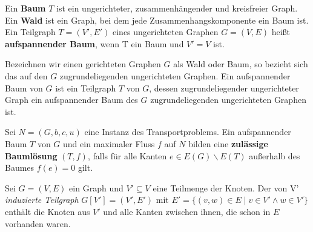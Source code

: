 \begin{defn}Ein \textbf{Baum} $T$ ist ein ungerichteter, zusammenhängender und kreisfreier Graph. Ein \textbf{Wald} ist ein Graph, bei dem jede Zusammenhangskomponente ein Baum ist. Ein Teilgraph $T=(V',E')$ eines ungerichteten Graphen $G=(V,E)$ heißt \textbf{aufspannender Baum}, wenn T ein Baum und $V'=V$ ist.\end{defn}

\begin{anm}Bezeichnen wir einen gerichteten Graphen $G$ als Wald oder Baum, so bezieht sich das auf den $G$ zugrundeliegenden ungerichteten Graphen. Ein aufspannender Baum von $G$ ist ein Teilgraph $T$ von $G$, dessen zugrundeliegender ungerichteter Graph ein aufspannender Baum des $G$ zugrundeliegenden ungerichteten Graphen ist.\end{anm}

\begin{defn}Sei $N=(G,b,c,u)$ eine Instanz des Transportproblems. Ein aufspannender Baum $T$ von $G$ und ein maximaler Fluss $f$ auf $N$ bilden eine \textbf{zulässige Baumlösung} $(T,f)$, falls für alle Kanten $e\in E(G)\backslash E(T)$ außerhalb des Baumes $f(e) = 0$ gilt.\end{defn}

\begin{nota}Sei $G=(V,E)$ ein Graph und $V'\subseteq V$ eine Teilmenge der Knoten. Der von V' \emph{induzierte Teilgraph} $G[V']=(V',E')$ mit $E'=\{(v,w)\in E\mid v\in V'\land w\in V'\}$ enthält die Knoten aus $V'$ und alle Kanten zwischen ihnen, die schon in $E$ vorhanden waren.\end{nota}

